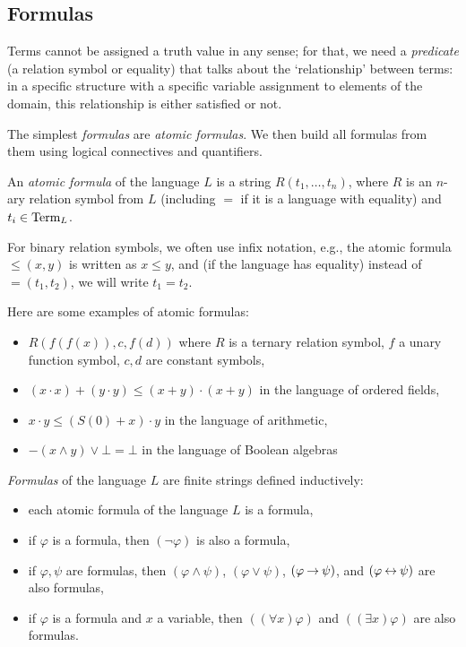 \subsection{Formulas}

Terms cannot be assigned a truth value in any sense; for that, we need a \emph{predicate} (a relation symbol or equality) that talks about the `relationship' between terms: in a specific structure with a specific variable assignment to elements of the domain, this relationship is either satisfied or not.

The simplest \emph{formulas} are \emph{atomic formulas}. We then build all formulas from them using logical connectives and quantifiers.

\begin{definition}
    An \emph{atomic formula} of the language $L$ is a string $R(t_1,\dots,t_n)$, where $R$ is an $n$-ary relation symbol from $L$ (including $=$ if it is a language with equality) and $t_i\in\operatorname{Term}_L$. %
\end{definition}

For binary relation symbols, we often use infix notation, e.g., the atomic formula $\leq(x,y)$ is written as $x\leq y$, and (if the language has equality) instead of $=(t_1,t_2)$, we will write $t_1=t_2$.

\begin{example}
    Here are some examples of atomic formulas:
    \begin{itemize}
        \item $R(f(f(x)),c, f(d))$ where $R$ is a ternary relation symbol, $f$ a unary function symbol, $c,d$ are constant symbols,
        \item $(x\cdot x)+(y\cdot y)\leq (x+y)\cdot(x+y)$ in the language of ordered fields,
        \item $x\cdot y\leq (S(0)+x)\cdot y$ in the language of arithmetic,
        \item $-(x\land y)\lor\bot=\bot$ in the language of Boolean algebras        
    \end{itemize}
\end{example}

\begin{definition}[Formula]
    \emph{Formulas} of the language $L$ are finite strings defined inductively: 
    \begin{itemize}
        \item each atomic formula of the language $L$ is a formula,
        \item if $\varphi$ is a formula, then $(\neg\varphi)$ is also a formula,
        \item if $\varphi,\psi$ are formulas, then $(\varphi\land\psi)$, $(\varphi\lor\psi)$, $(\varphi\mathbin{\rightarrow}\psi)$, and $(\varphi\mathbin{\leftrightarrow}\psi)$ are also formulas,
        \item if $\varphi$ is a formula and $x$ a variable, then $((\forall x)\varphi)$ and $((\exists x)\varphi)$ are also formulas.
        \end{itemize}    
\end{definition}

